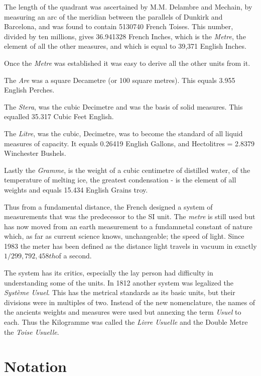 \documentclass{tufte-book}
\begin{document}
The length of the quadrant was ascertained by M.M. Delambre and Mechain, by measuring an arc of the meridian between the parallels of Dunkirk and Barcelona, and was found to contain \num{5130740} French Toises. This number, divided by ten millions, gives \num{36,941328} French Inches, which is the \textit{Metre}, the element of all the other measures, and which is equal to 39,371 English Inches.

Once the \textit{Metre} was established it was easy to derive all the other units from it.

The \textit{Are} was a square Decametre (or 100 square metres). This equals 3.955 English Perches.

The \textit{Stera}, was the cubic Decimetre and was the basis of solid measures. This equalled 35.317 Cubic Feet English.

The \textit{Litre}, was the cubic, Decimetre, was to become the standard of all liquid measures of capacity. It equals 0.26419 English Gallons, and Hectolitres = 2.8379 Winchester Bushels.

Lastly the \textit{Gramme}, is the weight of a cubic centimetre of distilled water, of the temperature of melting ice, the greatest condensation - is the element of all weights and equals 15.434 English Grains troy.

Thus from a fundamental distance, the French designed a system of measurements that was the predecessor to the SI unit. The \textit{metre} is still used but has now moved from an earth measurement to a fundamnetal constant of nature which, as far as current science knows, unchangeable; the speed of light. Since 1983 the meter has been defined as the distance light travels in vacuum in exactly \(1/299,792,458th\)of a second. 

The system has its critics, especially the lay person had difficulty in understanding some of the units. In 1812 another system was legalized the \textit{Syst\`eme Usuel}. This has the metrical standards as its basic units, but their divisions were in multiples of two. Instead of the new nomenclature, the names of the ancients weights and measures were used but annexing the term \textit{Usuel} to each. Thus the Kilogramme was called the \textit{Livre Usuelle} and the Double Metre the \textit{Toise Usuelle}.


\appendix

\chapter{Notation}
\end{document}
